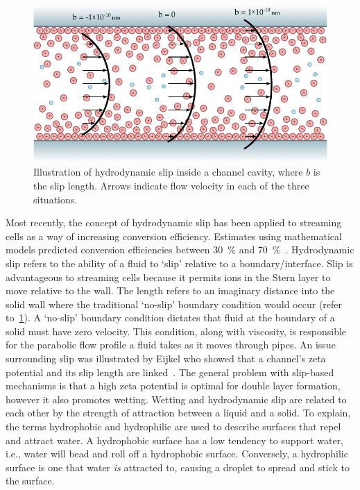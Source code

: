     \begin{figure}
      \centering
      \includegraphics[height=6cm]{content/pt1/graphics/HydrodynamicSlip}
      \caption{\label{fig:HydrodynamicSlip}Illustration of hydrodynamic slip inside a channel cavity, where $b$ is the slip length. Arrows indicate flow velocity in each of the three situations.}
    \end{figure}
    Most recently, the concept of hydrodynamic slip has been applied to streaming cells as a way of increasing conversion efficiency.
    Estimates using mathematical models predicted conversion efficiencies between \SI{30}{\percent} and \SI{70}{\percent}~\cite{Pennathur2007, Davidson2008a, Ren2008}.
    Hydrodynamic slip refers to the ability of a fluid to `slip' relative to a boundary/interface.
    Slip is advantageous to streaming cells because it permits ions in the Stern layer to move relative to the wall.
    The length refers to an imaginary distance into the solid wall where the traditional `no-slip' boundary condition would occur (refer to~\cref{fig:HydrodynamicSlip}).
    A `no-slip' boundary condition dictates that fluid at the boundary of a solid must have zero velocity.
    This condition, along with viscosity, is responsible for the parabolic flow profile a fluid takes as it moves through pipes.
    An issue surrounding slip was illustrated by Eijkel who showed that a channel's zeta potential and its slip length are linked~\cite{Eijkel2007}.
    The general problem with slip-based mechanisms is that a high zeta potential is optimal for double layer formation, however it also promotes wetting.
    Wetting and hydrodynamic slip are related to each other by the strength of attraction between a liquid and a solid.
    To explain, the terms hydrophobic and hydrophilic are used to describe surfaces that repel and attract water.
    A hydrophobic surface has a low tendency to support water, i.e., water will bead and roll off a hydrophobic surface.
    Conversely, a hydrophilic surface is one that water \emph{is} attracted to, causing a droplet to spread and stick to the surface.
